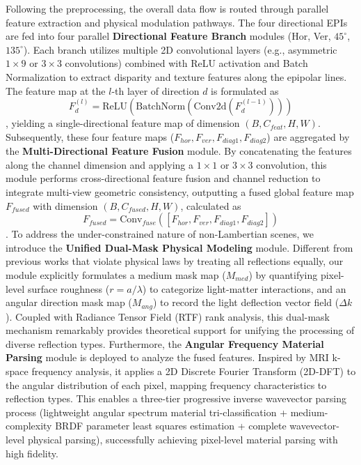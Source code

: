 Following the preprocessing, the overall data flow is routed through parallel feature extraction and physical modulation pathways. The four directional EPIs are fed into four parallel \textbf{Directional Feature Branch} modules (Hor, Ver, $45^\circ$, $135^\circ$). Each branch utilizes multiple 2D convolutional layers (e.g., asymmetric $1 \times 9$ or $3 \times 3$ convolutions) combined with ReLU activation and Batch Normalization to extract disparity and texture features along the epipolar lines. The feature map at the $l$-th layer of direction $d$ is formulated as \[
F_d^{(l)} = \text{ReLU}(\text{BatchNorm}(\text{Conv2d}(F_d^{(l-1)})))
\], yielding a single-directional feature map of dimension $(B, C_{feat}, H, W)$. Subsequently, these four feature maps ($F_{hor}, F_{ver}, F_{diag1}, F_{diag2}$) are aggregated by the \textbf{Multi-Directional Feature Fusion} module. By concatenating the features along the channel dimension and applying a $1 \times 1$ or $3 \times 3$ convolution, this module performs cross-directional feature fusion and channel reduction to integrate multi-view geometric consistency, outputting a fused global feature map $F_{fused}$ with dimension $(B, C_{fused}, H, W)$, calculated as \[
F_{fused} = \text{Conv}_{fuse}([F_{hor}, F_{ver}, F_{diag1}, F_{diag2}])
\]. To address the under-constrained nature of non-Lambertian scenes, we introduce the \textbf{Unified Dual-Mask Physical Modeling} module. Different from previous works that violate physical laws by treating all reflections equally, our module explicitly formulates a medium mask map ($M_{med}$) by quantifying pixel-level surface roughness ($r = a/\lambda$) to categorize light-matter interactions, and an angular direction mask map ($M_{ang}$) to record the light deflection vector field ($\Delta k$). Coupled with Radiance Tensor Field (RTF) rank analysis, this dual-mask mechanism remarkably provides theoretical support for unifying the processing of diverse reflection types. Furthermore, the \textbf{Angular Frequency Material Parsing} module is deployed to analyze the fused features. Inspired by MRI k-space frequency analysis, it applies a 2D Discrete Fourier Transform (2D-DFT) to the angular distribution of each pixel, mapping frequency characteristics to reflection types. This enables a three-tier progressive inverse wavevector parsing process (lightweight angular spectrum material tri-classification + medium-complexity BRDF parameter least squares estimation + complete wavevector-level physical parsing), successfully achieving pixel-level material parsing with high fidelity.

